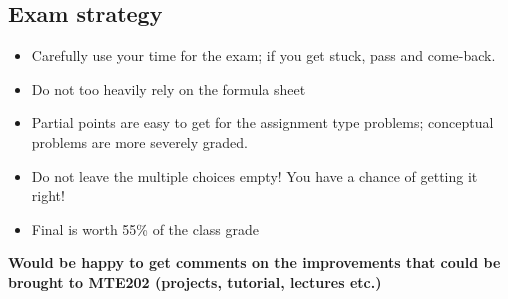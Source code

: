 \subsection*{Exam strategy}
\begin{itemize}
\item Carefully use your time for the exam; if you get stuck, pass and come-back.
\item Do not too heavily rely on the formula sheet
\item Partial points are easy to get for the assignment type problems; conceptual problems are more severely graded.
\item  Do not leave the multiple choices empty! You have a chance of getting it right!
\item Final is worth 55\% of the class grade
\end{itemize}

\textbf{Would be happy to get comments on the improvements that could be brought to MTE202 (projects, tutorial, lectures etc.)}


